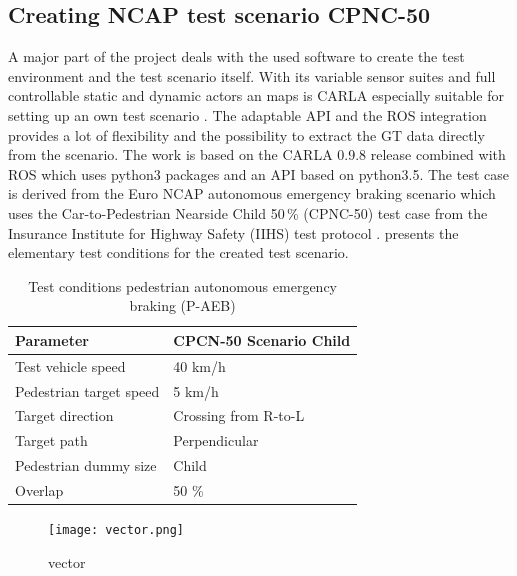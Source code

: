 
\subsection{Creating NCAP test scenario CPNC-50}
A major part of the project deals with the used software to create the test environment and the test scenario itself. With its variable sensor suites and full controllable static and dynamic actors an maps is CARLA especially suitable for setting up an own test scenario \cite{Dosovitskiy17}. The adaptable \ac{API} and the \ac{ROS} integration provides a lot of flexibility and the possibility to extract the \ac{GT} data directly from the scenario. The work is based on the CARLA 0.9.8 release combined with \ac{ROS} which uses python3 packages and an \ac{API} based on python3.5. The test case is derived from the Euro NCAP autonomous emergency braking scenario which uses the Car-to-Pedestrian Nearside Child 50\,\% (CPNC-50) test case from the Insurance Institute for Highway Safety (IIHS) test protocol \cite{NCAP, Protocoll}.  presents the elementary test conditions for the created test scenario. 

\begin{table}[h]
	\caption{Test conditions pedestrian autonomous emergency braking (P-AEB) \cite{Protocoll}}
	\label{Test conditions}
	\begin{center}
		\begin{tabular}{l l}
			\hline
			Parameter & CPCN-50 Scenario Child\\
			\hline
			Test vehicle speed & 40 km/h\\
			Pedestrian target speed & 5 km/h\\
			Target direction        & Crossing from R-to-L\\
			Target path             & Perpendicular\\
			Pedestrian dummy size   & Child\\
			Overlap                 & 50 \%\\
			\hline
			
			
		\end{tabular}
	\end{center}
\end{table}

\begin{figure}[H]
	\centering
	\texttt{[image: vector.png]}
	\caption{vector \cite{Aeberhard}}
	\label{fig:vectors}
\end{figure}

